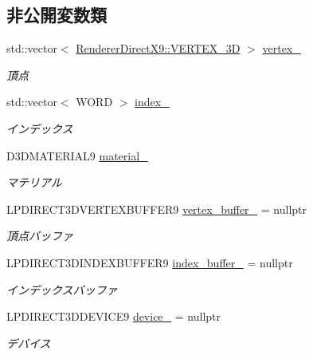 \subsection*{非公開変数類}
\begin{DoxyCompactItemize}
\item 
std\+::vector$<$ \mbox{\hyperlink{class_renderer_direct_x9_1_1_v_e_r_t_e_x__3_d}{Renderer\+Direct\+X9\+::\+V\+E\+R\+T\+E\+X\+\_\+3D}} $>$ \mbox{\hyperlink{class_cube_polygon_adef890976f8ff8675aeb1c8a5a56ba7b}{vertex\+\_\+}}
\begin{DoxyCompactList}\small\item\em 頂点 \end{DoxyCompactList}\item 
std\+::vector$<$ W\+O\+RD $>$ \mbox{\hyperlink{class_cube_polygon_ac1405f52ed52453068575f2fb8d420a5}{index\+\_\+}}
\begin{DoxyCompactList}\small\item\em インデックス \end{DoxyCompactList}\item 
D3\+D\+M\+A\+T\+E\+R\+I\+A\+L9 \mbox{\hyperlink{class_cube_polygon_a19348e35d55775f543a191b0a374b853}{material\+\_\+}}
\begin{DoxyCompactList}\small\item\em マテリアル \end{DoxyCompactList}\item 
L\+P\+D\+I\+R\+E\+C\+T3\+D\+V\+E\+R\+T\+E\+X\+B\+U\+F\+F\+E\+R9 \mbox{\hyperlink{class_cube_polygon_adbb5b6de2c10bfaba0d91569ac81e589}{vertex\+\_\+buffer\+\_\+}} = nullptr
\begin{DoxyCompactList}\small\item\em 頂点バッファ \end{DoxyCompactList}\item 
L\+P\+D\+I\+R\+E\+C\+T3\+D\+I\+N\+D\+E\+X\+B\+U\+F\+F\+E\+R9 \mbox{\hyperlink{class_cube_polygon_a42d5b3b2ed933782a28db4456ff552d3}{index\+\_\+buffer\+\_\+}} = nullptr
\begin{DoxyCompactList}\small\item\em インデックスバッファ \end{DoxyCompactList}\item 
L\+P\+D\+I\+R\+E\+C\+T3\+D\+D\+E\+V\+I\+C\+E9 \mbox{\hyperlink{class_cube_polygon_a769fe3f6b4695d5bf4823489b76ea805}{device\+\_\+}} = nullptr
\begin{DoxyCompactList}\small\item\em デバイス \end{DoxyCompactList}\end{DoxyCompactItemize}
